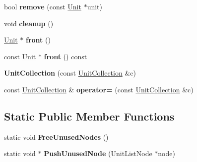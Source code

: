 \begin{DoxyCompactItemize}
\item 
bool {\bfseries remove} (const \hyperlink{classUnit}{Unit} $\ast$unit)\hypertarget{classUnitCollection_a76a3f0d1b27292072a01510603ba9a00}{}\label{classUnitCollection_a76a3f0d1b27292072a01510603ba9a00}

\item 
void {\bfseries cleanup} ()\hypertarget{classUnitCollection_a66eb5eb613c8db72c7bbab6537d056be}{}\label{classUnitCollection_a66eb5eb613c8db72c7bbab6537d056be}

\item 
\hyperlink{classUnit}{Unit} $\ast$ {\bfseries front} ()\hypertarget{classUnitCollection_a9c7936f3b81dede31d7660dd2b800758}{}\label{classUnitCollection_a9c7936f3b81dede31d7660dd2b800758}

\item 
const \hyperlink{classUnit}{Unit} $\ast$ {\bfseries front} () const \hypertarget{classUnitCollection_a346839359c477e54ddea4ea642f2f82f}{}\label{classUnitCollection_a346839359c477e54ddea4ea642f2f82f}

\item 
{\bfseries Unit\+Collection} (const \hyperlink{classUnitCollection}{Unit\+Collection} \&c)\hypertarget{classUnitCollection_a2a18aa224d317a2ce9232d95b31bc009}{}\label{classUnitCollection_a2a18aa224d317a2ce9232d95b31bc009}

\item 
const \hyperlink{classUnitCollection}{Unit\+Collection} \& {\bfseries operator=} (const \hyperlink{classUnitCollection}{Unit\+Collection} \&c)\hypertarget{classUnitCollection_a4af199d69f807fe2210258fb5267e435}{}\label{classUnitCollection_a4af199d69f807fe2210258fb5267e435}

\end{DoxyCompactItemize}
\subsection*{Static Public Member Functions}
\begin{DoxyCompactItemize}
\item 
static void {\bfseries Free\+Unused\+Nodes} ()\hypertarget{classUnitCollection_a2729f69459e4c23120e163c175f44809}{}\label{classUnitCollection_a2729f69459e4c23120e163c175f44809}

\item 
static void $\ast$ {\bfseries Push\+Unused\+Node} (Unit\+List\+Node $\ast$node)\hypertarget{classUnitCollection_afbf35562bd6ff492a72736bbc27b3cf2}{}\label{classUnitCollection_afbf35562bd6ff492a72736bbc27b3cf2}

\end{DoxyCompactItemize}
